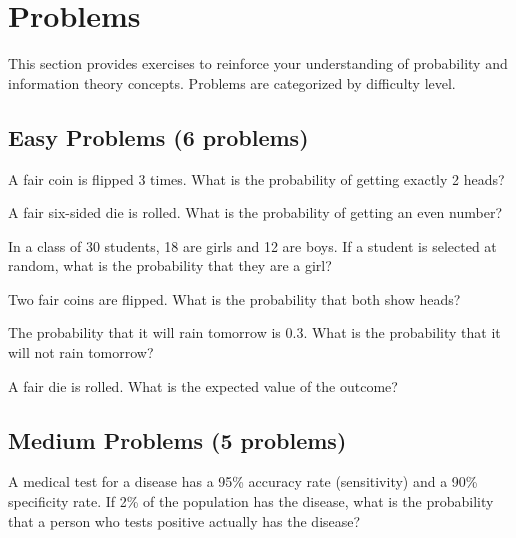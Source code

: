 
\section{Problems}
\label{sec:probability-problems}

This section provides exercises to reinforce your understanding of probability and information theory concepts. Problems are categorized by difficulty level.

\subsection{Easy Problems (6 problems)}

\begin{problem}
A fair coin is flipped 3 times. What is the probability of getting exactly 2 heads?
\end{problem}

\begin{problem}
A fair six-sided die is rolled. What is the probability of getting an even number?
\end{problem}

\begin{problem}
In a class of 30 students, 18 are girls and 12 are boys. If a student is selected at random, what is the probability that they are a girl?
\end{problem}

\begin{problem}
Two fair coins are flipped. What is the probability that both show heads?
\end{problem}

\begin{problem}
The probability that it will rain tomorrow is 0.3. What is the probability that it will not rain tomorrow?
\end{problem}

\begin{problem}
A fair die is rolled. What is the expected value of the outcome?
\end{problem}

\subsection{Medium Problems (5 problems)}

\begin{problem}
A medical test for a disease has a 95\% accuracy rate (sensitivity) and a 90\% specificity rate. If 2\% of the population has the disease, what is the probability that a person who tests positive actually has the disease?
\end{problem}

